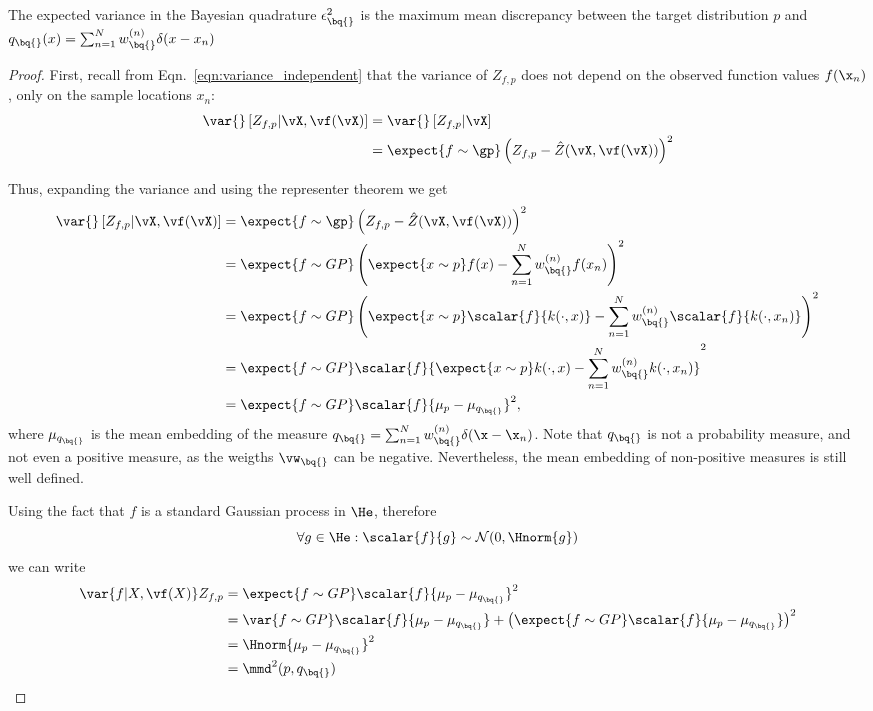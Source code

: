 \begin{proposition}
The expected variance in the Bayesian quadrature $\epsilon^{2}_{\bq{}}$  is the maximum mean discrepancy between the target distribution $p$ and $q_{\bq{}}(x) = \sum_{n=1}^{N}w^{(n)}_{\bq{}}\delta(x - x_n)$
%
\begin{proof}
First, recall from Eqn.\ \ref{eqn:variance_independent} that the variance of $Z_{f,p}$ does not depend on the observed function values $f(\x_n)$, only on the sample locations $x_n$:
%
\begin{align}
\var{} \left[ Z_{f,p} \vert \vX, \vf(\vX) \right] &= \var{} \left[ Z_{f,p} \vert \vX \right]\\
	&= \expect{f\sim\gp} \left(  Z_{f,p} - \hat{Z}(\vX,\vf(\vX)) \right)^2
\end{align}

Thus, expanding the variance and using the representer theorem we get
%
\begin{align}
	\var{} \left[ Z_{f,p} \vert \vX, \vf(\vX) \right] 
	&= \expect{f\sim\gp} \left( Z_{f,p} - \hat{Z}(\vX,\vf(\vX)) \right)^2\\
	&= \expect{f\sim GP} \left( \expect{x\sim p} f(x) - \sum_{n=1}^{N}w^{(n)}_{\bq{}} f(x_n)\right)^2\\	
	&= \expect{f\sim GP} \left( \expect{x\sim p} \scalar{f}{k(\cdot,x)} - \sum_{n=1}^{N}w^{(n)}_{\bq{}} \scalar{f}{k(\cdot,x_n)}\right)^2\\
	&= \expect{f\sim GP} \scalar{f}{\expect{x\sim p} k(\cdot,x) - \sum_{n=1}^{N}w^{(n)}_{\bq{}}k(\cdot,x_n)}^2\\
	&= \expect{f\sim GP} \scalar{f}{\mu_p - \mu_{q_{\bq{}}}}^2,
\end{align}
%
where $\mu_{q_{\bq{}}}$ is the mean embedding of the measure $q_{\bq{}} = \sum_{n=1}^{N} w^{(n)}_{\bq{}} \delta(\x - \x_n)$. Note that $q_{\bq{}}$ is not a probability measure, and not even a positive measure, as the weigths $\vw_{\bq{}}$ can be negative. Nevertheless, the mean embedding of non-positive measures is still well defined.

Using the fact that $f$ is a standard Gaussian process in $\He$, therefore
%
\begin{equation}
	\forall g\in\He: \scalar{f}{g} \sim \mathcal{N}(0,\Hnorm{g})
\end{equation}
%
we can write
%
\begin{align}
	\var{f\vert X,\vf(X)} Z_{f,p} &= \expect{f\sim GP} \scalar{f}{\mu_p - \mu_{q_{\bq{}}}}^2\\
	&= \var{f\sim GP} \scalar{f}{\mu_p - \mu_{q_{\bq{}}}} + \left(\expect{f\sim GP} \scalar{f}{\mu_p - \mu_{q_{\bq{}}}} \right)^2\\
	&= \Hnorm{\mu_p - \mu_{q_{\bq{}}}}^2\\
	&= \mmd^2(p,q_{\bq{}})
\end{align}
\end{proof}
\end{proposition}

